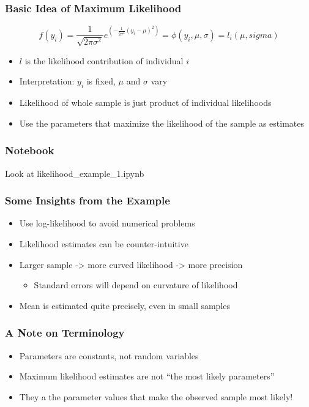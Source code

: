 \documentclass[11pt]{beamer}
\begin{document}
\begin{frame}[c]\frametitle{Basic Idea of Maximum Likelihood}
    \begin{equation}
        f(y_i) = \frac{1}{\sqrt{2\pi\sigma^2}} e^{\left(-\frac{1}{2 \sigma^2}(y_i - \mu)^2\right)} = \phi(y_i, \mu, \sigma) = l_i(\mu, sigma)
    \end{equation}
    \begin{itemize}
        \item $l$ is the likelihood contribution of individual $i$
        \item Interpretation: $y_i$ is fixed, $\mu$ and $\sigma$ vary
        \item Likelihood of whole sample is just product of individual likelihoods
        \item Use the parameters that maximize the likelihood of the sample as estimates
    \end{itemize}
\end{frame}


\begin{frame}[c]\frametitle{Notebook}
    Look at likelihood\_example\_1.ipynb
\end{frame}


\begin{frame}[c]\frametitle{Some Insights from the Example}
    \begin{itemize}

        \item Use log-likelihood to avoid numerical problems
        \item Likelihood estimates can be counter-intuitive
        \item Larger sample -> more curved likelihood -> more precision
        \begin{itemize}
            \item Standard errors will depend on curvature of likelihood
        \end{itemize}
        \item Mean is estimated quite precisely, even in small samples
    \end{itemize}
\end{frame}


\begin{frame}[c]\frametitle{A Note on Terminology}
    \begin{itemize}
        \item Parameters are constants, not random variables
        \item Maximum likelihood estimates are not ``the most likely parameters''
        \item They a the parameter values that make the observed sample most likely!
    \end{itemize}
\end{frame}
\end{document}
